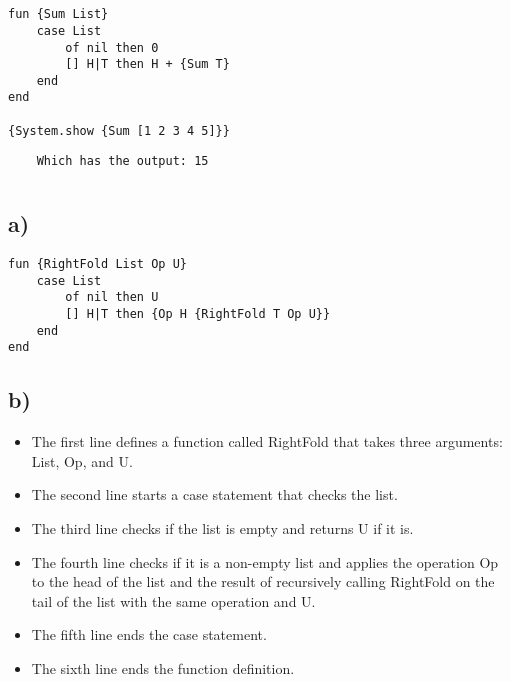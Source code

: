 \documentclass[11pt,a4paper]{report}
\begin{document}
\section{}
\begin{lstlisting}[language=Oz]
fun {Sum List}
    case List
        of nil then 0
        [] H|T then H + {Sum T}
    end
end

{System.show {Sum [1 2 3 4 5]}}
\end{lstlisting}
\begin{verbatim}
    Which has the output: 15
\end{verbatim}

\clearpage

\section{}

\subsection{a)}


\begin{lstlisting}[language=Oz]
fun {RightFold List Op U}
    case List 
        of nil then U
        [] H|T then {Op H {RightFold T Op U}}
    end
end
\end{lstlisting}

\subsection{b)}

    \begin{itemize}
        \item The first line defines a function called RightFold that takes three arguments: List, Op, and U.  
        \item The second line starts a case statement that checks the list.  
        \item The third line checks if the list is empty and returns U if it is.  
        \item The fourth line checks if it is a non-empty list and applies the operation Op to the head of the list and the result of recursively calling RightFold on the tail of the list with the same operation and U.  
        \item The fifth line ends the case statement.  
        \item The sixth line ends the function definition.
    \end{itemize}
\end{document}
